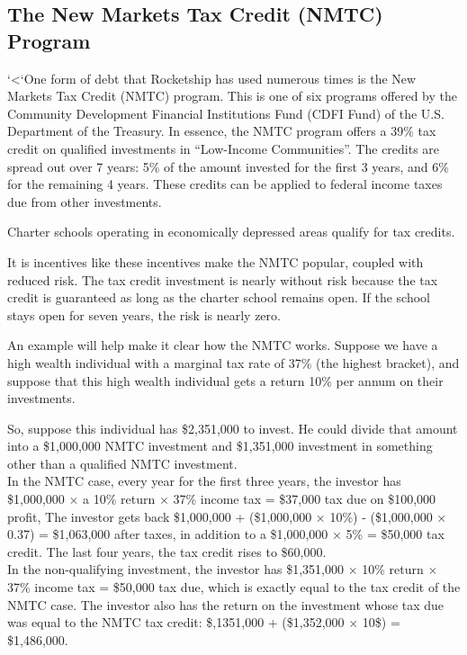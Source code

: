 \subsection{The New Markets Tax Credit (NMTC) Program}%
\label{sec:NMTC}\indent%

`<`One form of debt that Rocketship has used numerous times is the New Markets Tax Credit (NMTC) program. This is one of six programs offered by the Community Development Financial Institutions Fund (CDFI Fund) of the U.S. Department of the Treasury. In essence, the NMTC program offers a 39\% tax credit on qualified investments in ``Low-Income Communities''. The credits are spread out over 7 years: 5\% of the amount invested for the first 3 years, and 6\% for the remaining 4 years. These credits can be applied to federal income taxes due from other investments. 

Charter schools operating in economically depressed areas qualify for tax credits. 

It is incentives like these incentives make the NMTC popular, coupled with reduced risk. The tax credit investment is nearly without risk because the tax credit is guaranteed as long as the charter school remains open. If the school stays open for seven years, the risk is nearly zero.

An example will help make it clear how the NMTC works. Suppose we have a high wealth individual with a marginal tax rate of 37\% (the highest bracket), and suppose that this high wealth individual gets a return 10\% per annum on their investments.

So, suppose this individual has \$2,351,000 to invest. He could divide that amount into a \$1,000,000 NMTC investment and \$1,351,000 investment in something other than a qualified NMTC investment. \\

In the NMTC case, every year for the first three years, the investor has \$1,000,000 $\times$ a 10\% return $\times$ 37\% income tax = \$37,000 tax due on \$100,000 profit, The investor gets back \$1,000,000 + (\$1,000,000 × 10\%) - (\$1,000,000 × 0.37) = \$1,063,000 after taxes, in addition to a \$1,000,000 × 5\% = \$50,000 tax credit. The last four years, the tax credit rises to \$60,000. \\
  
In the non-qualifying investment, the investor has \$1,351,000 $\times$ 10\% return $\times$ 37\% income tax = \$50,000 tax due, which is exactly equal to the tax credit of the NMTC case. The investor also has the return on the investment whose tax due was equal to the NMTC tax credit: \$,1351,000 + (\$1,352,000 $\times$ 10\$) = \$1,486,000.\\

